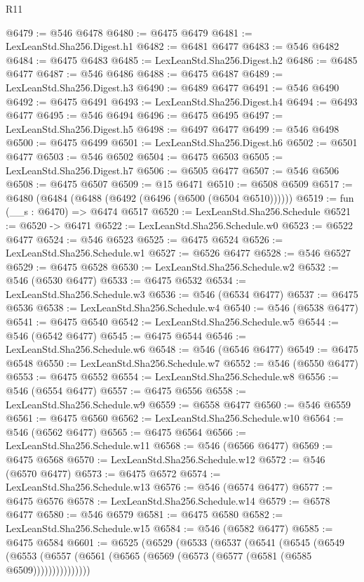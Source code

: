 \begin{lexlean}{R11}
\begin{coremodule}
{{{{{{{{{{{{{{{{{{{{{{{{{{{{{{{{{{{{{{{{{{{{{{{{{{{{{{{{{{{{{{{{{{{{{{{{{{{{{{{{{{@6479 := @546 @6478
@6480 := @6475 @6479
@6481 := LexLeanStd.Sha256.Digest.h1
@6482 := @6481 @6477
@6483 := @546 @6482
@6484 := @6475 @6483
@6485 := LexLeanStd.Sha256.Digest.h2
@6486 := @6485 @6477
@6487 := @546 @6486
@6488 := @6475 @6487
@6489 := LexLeanStd.Sha256.Digest.h3
@6490 := @6489 @6477
@6491 := @546 @6490
@6492 := @6475 @6491
@6493 := LexLeanStd.Sha256.Digest.h4
@6494 := @6493 @6477
@6495 := @546 @6494
@6496 := @6475 @6495
@6497 := LexLeanStd.Sha256.Digest.h5
@6498 := @6497 @6477
@6499 := @546 @6498
@6500 := @6475 @6499
@6501 := LexLeanStd.Sha256.Digest.h6
@6502 := @6501 @6477
@6503 := @546 @6502
@6504 := @6475 @6503
@6505 := LexLeanStd.Sha256.Digest.h7
@6506 := @6505 @6477
@6507 := @546 @6506
@6508 := @6475 @6507
@6509 := @15 @6471
@6510 := @6508 @6509
@6517 := @6480 (@6484 (@6488 (@6492 (@6496 (@6500 (@6504 @6510))))))
@6519 := fun (__s : @6470) => @6474 @6517
@6520 := LexLeanStd.Sha256.Schedule
@6521 := @6520 -> @6471
@6522 := LexLeanStd.Sha256.Schedule.w0
@6523 := @6522 @6477
@6524 := @546 @6523
@6525 := @6475 @6524
@6526 := LexLeanStd.Sha256.Schedule.w1
@6527 := @6526 @6477
@6528 := @546 @6527
@6529 := @6475 @6528
@6530 := LexLeanStd.Sha256.Schedule.w2
@6532 := @546 (@6530 @6477)
@6533 := @6475 @6532
@6534 := LexLeanStd.Sha256.Schedule.w3
@6536 := @546 (@6534 @6477)
@6537 := @6475 @6536
@6538 := LexLeanStd.Sha256.Schedule.w4
@6540 := @546 (@6538 @6477)
@6541 := @6475 @6540
@6542 := LexLeanStd.Sha256.Schedule.w5
@6544 := @546 (@6542 @6477)
@6545 := @6475 @6544
@6546 := LexLeanStd.Sha256.Schedule.w6
@6548 := @546 (@6546 @6477)
@6549 := @6475 @6548
@6550 := LexLeanStd.Sha256.Schedule.w7
@6552 := @546 (@6550 @6477)
@6553 := @6475 @6552
@6554 := LexLeanStd.Sha256.Schedule.w8
@6556 := @546 (@6554 @6477)
@6557 := @6475 @6556
@6558 := LexLeanStd.Sha256.Schedule.w9
@6559 := @6558 @6477
@6560 := @546 @6559
@6561 := @6475 @6560
@6562 := LexLeanStd.Sha256.Schedule.w10
@6564 := @546 (@6562 @6477)
@6565 := @6475 @6564
@6566 := LexLeanStd.Sha256.Schedule.w11
@6568 := @546 (@6566 @6477)
@6569 := @6475 @6568
@6570 := LexLeanStd.Sha256.Schedule.w12
@6572 := @546 (@6570 @6477)
@6573 := @6475 @6572
@6574 := LexLeanStd.Sha256.Schedule.w13
@6576 := @546 (@6574 @6477)
@6577 := @6475 @6576
@6578 := LexLeanStd.Sha256.Schedule.w14
@6579 := @6578 @6477
@6580 := @546 @6579
@6581 := @6475 @6580
@6582 := LexLeanStd.Sha256.Schedule.w15
@6584 := @546 (@6582 @6477)
@6585 := @6475 @6584
@6601 := @6525
    (@6529
      (@6533
        (@6537
          (@6541
            (@6545
              (@6549
                (@6553 (@6557 (@6561 (@6565 (@6569 (@6573 (@6577 (@6581 (@6585 @6509)))))))))))))))
}}}}}}}}}}}}}}}}}}}}}}}}}}}}}}}}}}}}}}}}}}}}}}}}}}}}}}}}}}}}}}}}}}}}}}}}}}}}}}}}}}
\end{coremodule}
\end{lexlean}
